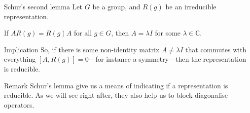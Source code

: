 \documentclass[a4paper]{article}
\begin{document}
\begin{parag}{Schur's second lemma}
    Let $G$ be a group, and $R\left(g\right)$ be an irreducible representation.

    If $A R\left(g\right) = R\left(g\right) A$ for all $g \in G$, then $A = \lambda I$ for some $\lambda \in \mathbb{C}$.

    \begin{subparag}{Implication}
        So, if there is some non-identity matrix $A \neq \lambda I$ that commutes with everything $\left[A, R\left(g\right)\right] = 0$---for instance a symmetry---then the representation is reducible. 
    \end{subparag}
\end{parag}

\begin{parag}{Remark}
    Schur's lemma give us a means of indicating if a representation is reducible. As we will see right after, they also help us to block diagonalise operators.
\end{parag}
\end{document}
